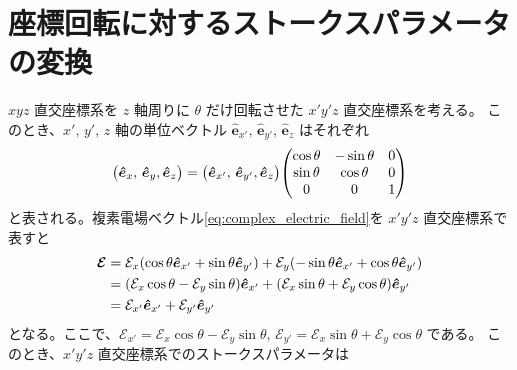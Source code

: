 \documentclass[../../main.tex]{subfiles}
\begin{document}
\section{座標回転に対するストークスパラメータの変換}
\label{sec:stokes_transform}
$xyz$ 直交座標系を $z$ 軸周りに $\theta$ だけ回転させた $x'y'z$ 直交座標系を考える。
このとき、$x',\,y',\,z$ 軸の単位ベクトル $\bm{\hat{e}}_{x'},\,\bm{\hat{e}}_{y'},\,\bm{\hat{e}}_{z}$ はそれぞれ
\begin{equation}
    \mqty(\bm{\hat{e}}_{x},\,\bm{\hat{e}}_{y},\bm{\hat{e}}_{z}) = 
        \mqty(\bm{\hat{e}}_{x'},\,\bm{\hat{e}}_{y'},\bm{\hat{e}}_{z})
        \mqty(\cos\theta & -\sin\theta & 0 \\
              \sin\theta & \cos\theta & 0 \\
              0 & 0 & 1
              )
\end{equation}
と表される。複素電場ベクトル\eqref{eq:complex_electric_field}を $x'y'z$ 直交座標系で表すと
\begin{align}
    \bm{\mathcal{E}} &= \mathcal{E}_{x}\qty(\cos\theta \bm{\hat{e}}_{x'} + \sin\theta \bm{\hat{e}}_{y'}) + \mathcal{E}_{y}(-\sin\theta \bm{\hat{e}}_{x'} + \cos\theta\bm{\hat{e}}_{y'}) \\
    &= \qty(\mathcal{E}_{x}\cos\theta - \mathcal{E}_{y}\sin\theta)\bm{\hat{e}}_{x'} + \qty(\mathcal{E}_{x}\sin\theta + \mathcal{E}_{y}\cos\theta)\bm{\hat{e}}_{y'} \\
    &= \mathcal{E}_{x'}\bm{\hat{e}}_{x'} + \mathcal{E}_{y'}\bm{\hat{e}}_{y'}
\end{align}
となる。ここで、$\mathcal{E}_{x'} = \mathcal{E}_{x}\cos\theta - \mathcal{E}_{y}\sin\theta,\,\mathcal{E}_{y'}=\mathcal{E}_{x}\sin\theta + \mathcal{E}_{y}\cos\theta$ である。
このとき、$x'y'z$ 直交座標系でのストークスパラメータは
\end{document}

